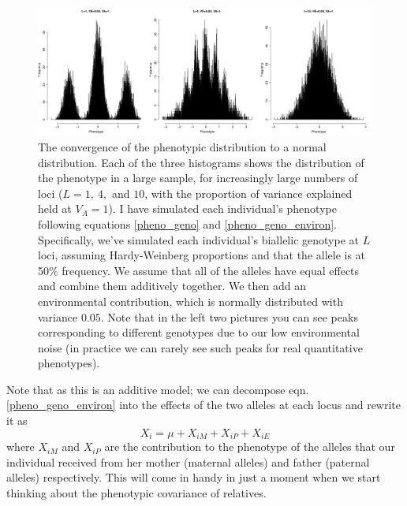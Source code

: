 \begin{figure}
\begin{center}
\includegraphics[width=\textwidth]{figures/QT1.png}
\end{center}
\caption{The convergence of the phenotypic distribution to a normal
  distribution. Each of the three histograms shows the distribution of
the phenotype in a large sample, for increasingly large numbers of loci ($L=1,~4,$ and $10$, with the proportion of variance explained held at $V_A=1$). I have simulated each individual's
phenotype following equations \ref{pheno_geno} and \ref{pheno_geno_environ}. Specifically, we've simulated each
individual's biallelic genotype at $L$ loci, assuming Hardy-Weinberg proportions
and that the allele is at 50\% frequency. We assume that all of the
alleles have equal effects and combine them additively together. We then add an environmental contribution, which is normally distributed with variance $0.05$. Note that in the left two pictures you can see peaks
corresponding to different genotypes due to our low  environmental
noise (in practice we can rarely see such peaks for real quantitative phenotypes). } \label{fig:QT1}
\end{figure}
Note that as this is an additive model; we can decompose eqn. \ref{pheno_geno_environ} into the
effects of the two alleles at each locus and rewrite
it as
\begin{equation}
X_i = \mu + X_{iM}+X_{iP} +X_{iE}
\end{equation}
where $X_{iM}$ and $X_{iP}$ are the contribution to the phenotype of
the alleles that our individual received from her mother (maternal
alleles) and father (paternal alleles) respectively. This will come in
handy in just a moment when we start thinking about the phenotypic covariance of relatives.\\


